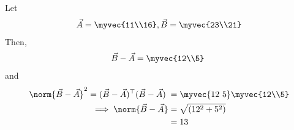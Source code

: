 Let 
\begin{align}
    \vec{A} = \myvec{11\\16}, \vec{B} = \myvec{23\\21}
\end{align}
Then,
\begin{align}
\vec{B}-\vec{A} = \myvec{12\\5}\;
\end{align}
and
%
\begin{align}
 \norm{\vec{B}-\vec{A}}^2= (\vec{B}-\vec{A})^\top (\vec{B}-\vec{A})\;
&=  \myvec{12 \ 5} \myvec{12\\5}\\
\implies \norm{\vec{B}-\vec{A}}&=\sqrt{(12^2 + 5^2)}\\\nonumber
&=13\\\nonumber
\end{align}

